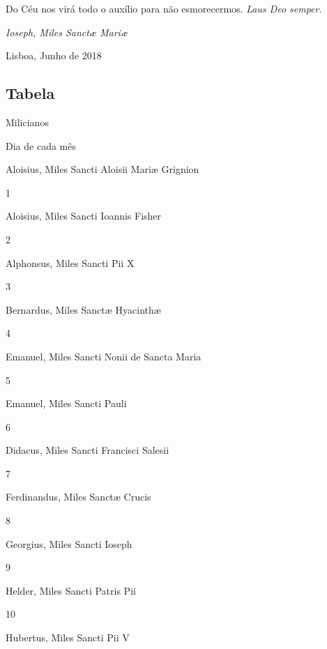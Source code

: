 \documentclass[paper=a5,10pt,openany]{scrbook}
\begin{document}
Do Céu nos virá todo o auxílio para não esmorecermos. 
\textit{Laus Deo semper}.

\textit{Ioseph, Miles Sanctæ Mariæ}

Lisboa, Junho de 2018

 \subsection{Tabela}

\begin{paracol}{2}
\begin{nscenter}Milicianos\end{nscenter}
\switchcolumn
\begin{nscenter}Dia de cada mês\end{nscenter}
\switchcolumn*
Aloisius, Miles Sancti Aloisii Mariæ Grignion
\switchcolumn
\begin{nscenter}1\end{nscenter}
\switchcolumn*
Aloisius, Miles Sancti Ioannis Fisher
\switchcolumn
\begin{nscenter}2\end{nscenter}
\switchcolumn*
Alphonsus, Miles Sancti Pii X
\switchcolumn
\begin{nscenter}3\end{nscenter}
\switchcolumn*
Bernardus, Miles Sanctæ Hyacinthæ
\switchcolumn
\begin{nscenter}4\end{nscenter}
\switchcolumn*
Emanuel, Miles Sancti Nonii de Sancta Maria
\switchcolumn
\begin{nscenter}5\end{nscenter}
\switchcolumn*
Emanuel, Miles Sancti Pauli
\switchcolumn
\begin{nscenter}6\end{nscenter}
\switchcolumn*
Didacus, Miles Sancti Francisci Salesii
\switchcolumn
\begin{nscenter}7\end{nscenter}
\switchcolumn*
Ferdinandus, Miles Sanctæ Crucis
\switchcolumn
\begin{nscenter}8\end{nscenter}
\switchcolumn*
Georgius, Miles Sancti Ioseph
\switchcolumn
\begin{nscenter}9\end{nscenter}
\switchcolumn*
Helder, Miles Sancti Patris Pii
\switchcolumn
\begin{nscenter}10\end{nscenter}
\switchcolumn*
Hubertus, Miles Sancti Pii V

\end{paracol}
\end{document}
